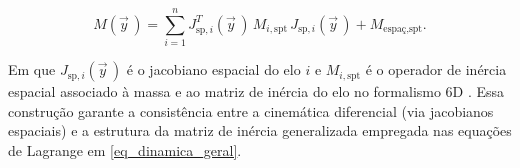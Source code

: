\begin{equation}
M(\vec y\,) =
\sum_{i=1}^{n}
J_{\text{sp},i}^{T}(\vec y\,)\,
M_{i,\text{spt}}\,
J_{\text{sp},i}(\vec y\,)
+
M_{\text{espaç},\text{spt}}.
\label{eq_M_total_formula}
\end{equation}


Em que $J_{\text{sp},i}(\vec y\,)$ é o jacobiano espacial do elo $i$ e
$M_{i,\text{spt}}$ é o operador de inércia espacial associado à
massa e ao matriz de inércia do elo no formalismo 6D
\cite{featherstone2008}.
Essa construção garante a consistência entre a
cinemática diferencial (via jacobianos espaciais) e a estrutura da
matriz de inércia generalizada empregada nas equações de Lagrange em
\eqref{eq_dinamica_geral}.
